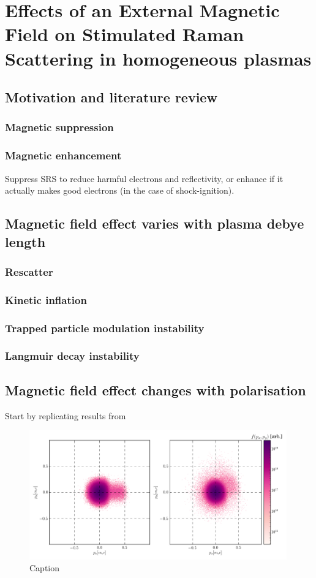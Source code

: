 \chapter{Effects of an External Magnetic Field on Stimulated Raman Scattering in homogeneous plasmas}
\label{chp:magSRS}

\section{Motivation and literature review}
\subsection{Magnetic suppression}
\subsection{Magnetic enhancement}
Suppress SRS to reduce harmful electrons and reflectivity, or enhance if it actually makes good electrons (in the case of shock-ignition).

\section{Magnetic field effect varies with plasma debye length}
\subsection{Rescatter}
\subsection{Kinetic inflation}
\subsection{Trapped particle modulation instability}
\subsection{Langmuir decay instability}

\section{Magnetic field effect changes with polarisation}

Start by replicating results from \cite{Winjum2018}

\begin{figure}
    \centering
    \includegraphics[width=0.99\textwidth]{Chapters/C6_magSRS/best_px_py_compare.png}
    \caption{Caption}
    \label{fig:my_label}
\end{figure}{}